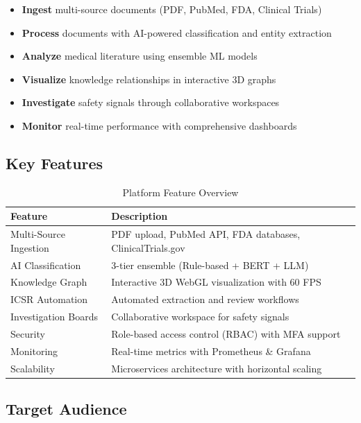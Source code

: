\documentclass[11pt,a4paper,twoside]{book}
\begin{document}
\begin{itemize}[itemsep=10pt]
    \item \textbf{Ingest} multi-source documents (PDF, PubMed, FDA, Clinical Trials)
    \item \textbf{Process} documents with AI-powered classification and entity extraction
    \item \textbf{Analyze} medical literature using ensemble ML models
    \item \textbf{Visualize} knowledge relationships in interactive 3D graphs
    \item \textbf{Investigate} safety signals through collaborative workspaces
    \item \textbf{Monitor} real-time performance with comprehensive dashboards
\end{itemize}

\subsection{Key Features}

\begin{table}[h]
\centering
\caption{Platform Feature Overview}
\begin{tabularx}{\textwidth}{lX}
\toprule
\textbf{Feature} & \textbf{Description} \\
\midrule
Multi-Source Ingestion & PDF upload, PubMed API, FDA databases, ClinicalTrials.gov \\
AI Classification & 3-tier ensemble (Rule-based + BERT + LLM) \\
Knowledge Graph & Interactive 3D WebGL visualization with 60 FPS \\
ICSR Automation & Automated extraction and review workflows \\
Investigation Boards & Collaborative workspace for safety signals \\
Security & Role-based access control (RBAC) with MFA support \\
Monitoring & Real-time metrics with Prometheus \& Grafana \\
Scalability & Microservices architecture with horizontal scaling \\
\bottomrule
\end{tabularx}
\end{table}

\subsection{Target Audience}
\end{document}
